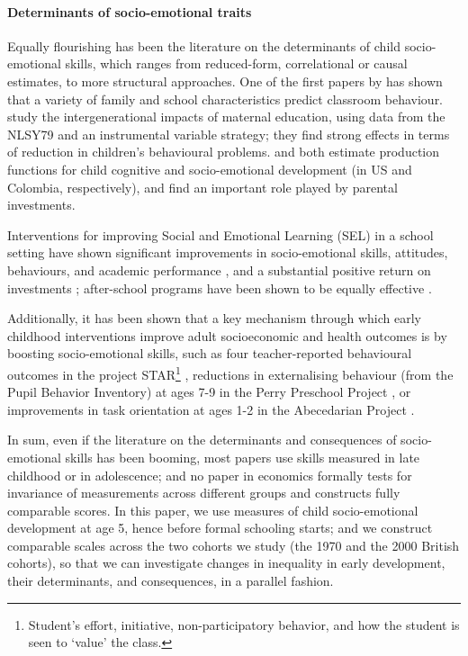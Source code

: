 \paragraph{Determinants of socio-emotional traits} Equally flourishing has been the literature on the determinants of child socio-emotional skills, which ranges from reduced-form, correlational or causal estimates, to more structural approaches. One of the first papers by \citet{Segal2008} has shown that a variety of family and school characteristics predict classroom behaviour. \citet{Carneiro2013} study the intergenerational impacts of maternal education, using data from the NLSY79 and an instrumental variable strategy; they find strong effects in terms of reduction in children's behavioural problems. \citet{Cunha2010} and \citet{Attanasio2018a} both estimate production functions for child cognitive and socio-emotional development (in US and Colombia, respectively), and find an important role played by parental investments.

Interventions for improving Social and Emotional Learning (SEL) in a school setting have shown significant improvements in socio-emotional skills, attitudes, behaviours, and academic performance \citep{Durlak2011}, and a substantial positive return on investments \citep{Belfield2015}; after-school programs have been shown to be equally effective \citep{Durlak2010}.

Additionally, it has been shown that a key mechanism through which early childhood interventions improve adult socioeconomic and health outcomes is by boosting socio-emotional skills, such as four teacher-reported behavioural outcomes in the project STAR\footnote{Student's effort, initiative, non-participatory  behavior, and how the student is seen to `value' the class.} \citep{Chetty2011a}, reductions in externalising behaviour (from the Pupil Behavior Inventory) at ages 7-9 in the Perry Preschool Project \citep{Heckman2013,Conti2016a}, or improvements in task orientation at ages 1-2 in the Abecedarian Project \citep{Conti2016a}.

In sum, even if the literature on the determinants and consequences of socio-emotional skills has been booming, most papers use skills measured in late childhood or in adolescence; and no paper in economics formally tests for invariance of measurements across different groups and constructs fully comparable scores. In this paper, we use measures of child socio-emotional development at age 5, hence before formal schooling starts; and we construct comparable scales across the two cohorts we study (the 1970 and the 2000 British cohorts), so that we can investigate changes in inequality in early development, their determinants, and consequences, in a parallel fashion. 

